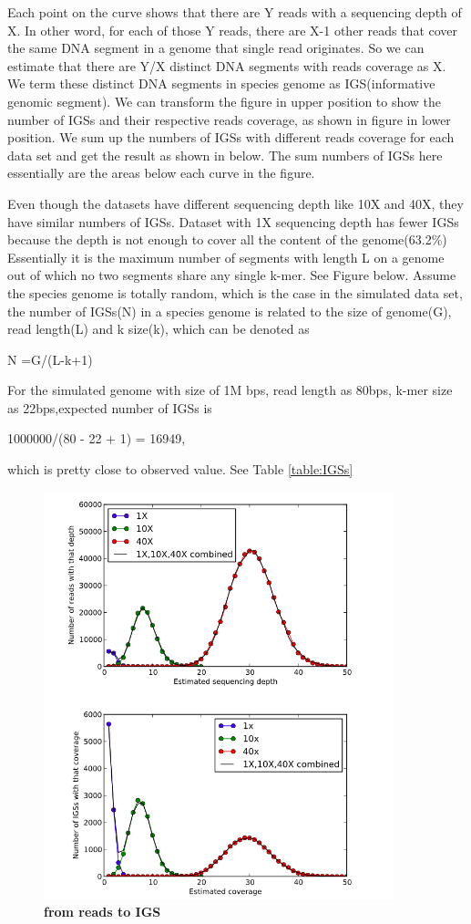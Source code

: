 Each point on the curve shows that there are Y reads with a sequencing depth of X. In other word, for each of those Y reads, there are X-1 other reads that cover the same DNA segment in a genome that single read originates. So we can estimate that there are Y/X distinct DNA segments with reads coverage as X. We term these distinct DNA segments in species genome as IGS(informative genomic segment). We can transform the figure in upper position to show the number of IGSs and their respective reads coverage, as shown in figure in lower position. We sum up the numbers of IGSs with different reads coverage for each data set and get the result as shown in below. The sum numbers of IGSs here essentially are the areas below each curve in the figure.

Even though the datasets have different sequencing depth like 10X and 40X, they have similar numbers of IGSs. Dataset with 1X sequencing depth has fewer IGSs because the depth is not enough to cover all the content of the genome(63.2\%) Essentially it is the maximum number of segments with length L on a genome out of which no two segments share any single k-mer. See Figure below. Assume the species genome is totally random, which is the case in the simulated data set, the number of IGSs(N) in a species genome is related to the size of genome(G), read length(L) and k size(k), which can be denoted as

N =G/(L-k+1)

For the simulated genome with size of 1M bps, read length as 80bps, k-mer size as 22bps,expected number of IGSs is 

1000000/(80 - 22 + 1) = 16949, 

which is pretty close to observed value. See Table \ref{table:IGSs}


\begin{figure}[!ht]
\centerline{\includegraphics[width=4in]{./figures/from_reads_to_IGS.png}}
\caption{\bf from reads to IGS}
\label{fig:reads_to_IGS}
\end{figure}

